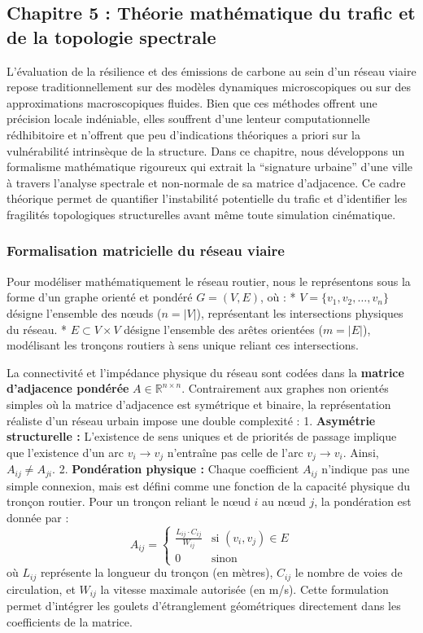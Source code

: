 \documentclass[10pt, a4paper]{article}
\begin{document}
\subsection{Chapitre 5 : Théorie mathématique du trafic et de la
topologie
spectrale}\label{chapitre-5-thuxe9orie-mathuxe9matique-du-trafic-et-de-la-topologie-spectrale}

L'évaluation de la résilience et des émissions de carbone au sein d'un
réseau viaire repose traditionnellement sur des modèles dynamiques
microscopiques ou sur des approximations macroscopiques fluides. Bien
que ces méthodes offrent une précision locale indéniable, elles
souffrent d'une lenteur computationnelle rédhibitoire et n'offrent que
peu d'indications théoriques a priori sur la vulnérabilité intrinsèque
de la structure. Dans ce chapitre, nous développons un formalisme
mathématique rigoureux qui extrait la ``signature urbaine'' d'une ville
à travers l'analyse spectrale et non-normale de sa matrice d'adjacence.
Ce cadre théorique permet de quantifier l'instabilité potentielle du
trafic et d'identifier les fragilités topologiques structurelles avant
même toute simulation cinématique.

\subsubsection{Formalisation matricielle du réseau
viaire}\label{formalisation-matricielle-du-ruxe9seau-viaire}

Pour modéliser mathématiquement le réseau routier, nous le représentons
sous la forme d'un graphe orienté et pondéré \(G = (V, E)\), où : *
\(V = \{v_1, v_2, \dots, v_n\}\) désigne l'ensemble des nœuds
(\(n = |V|\)), représentant les intersections physiques du réseau. *
\(E \subset V \times V\) désigne l'ensemble des arêtes orientées
(\(m = |E|\)), modélisant les tronçons routiers à sens unique reliant
ces intersections.

La connectivité et l'impédance physique du réseau sont codées dans la
\textbf{matrice d'adjacence pondérée} \(A \in \mathbb{R}^{n \times n}\).
Contrairement aux graphes non orientés simples où la matrice d'adjacence
est symétrique et binaire, la représentation réaliste d'un réseau urbain
impose une double complexité : 1. \textbf{Asymétrie structurelle :}
L'existence de sens uniques et de priorités de passage implique que
l'existence d'un arc \(v_i \to v_j\) n'entraîne pas celle de l'arc
\(v_j \to v_i\). Ainsi, \(A_{ij} \neq A_{ji}\). 2. \textbf{Pondération
physique :} Chaque coefficient \(A_{ij}\) n'indique pas une simple
connexion, mais est défini comme une fonction de la capacité physique du
tronçon routier. Pour un tronçon reliant le nœud \(i\) au nœud \(j\), la
pondération est donnée par :
\[A_{ij} = \begin{cases} \frac{L_{ij} \cdot C_{ij}}{W_{ij}} & \text{si } (v_i, v_j) \in E \\ 0 & \text{sinon} \end{cases}\]
où \(L_{ij}\) représente la longueur du tronçon (en mètres), \(C_{ij}\)
le nombre de voies de circulation, et \(W_{ij}\) la vitesse maximale
autorisée (en m/s). Cette formulation permet d'intégrer les goulets
d'étranglement géométriques directement dans les coefficients de la
matrice.
\end{document}
